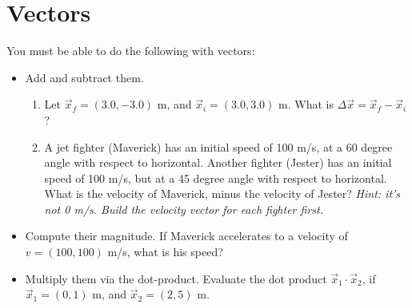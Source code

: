 \documentclass[10pt]{article}
\begin{document}
\section{Vectors}
You must be able to do the following with vectors:
\begin{itemize}
\item Add and subtract them.
\begin{enumerate}
\item Let $\vec{x}_f = (3.0,-3.0)$ m, and $\vec{x}_i = (3.0,3.0)$ m.  What is $\Delta \vec{x} = \vec{x}_f - \vec{x}_i$? \\ \vspace{1cm}
\item A jet fighter (Maverick) has an initial speed of 100 m/s, at a 60 degree angle with respect to horizontal.  Another fighter (Jester) has an initial speed of 100 m/s, but at a 45 degree angle with respect to horizontal.  What is the velocity of Maverick, minus the velocity of Jester?  \textit{Hint: it's not 0 m/s.  Build the velocity vector for each fighter first.} \\ \vspace{1.5cm}
\end{enumerate}
\item Compute their magnitude.  If Maverick accelerates to a velocity of $v = (100,100)$ m/s, what is his speed? \\ \vspace{1cm}
\item Multiply them via the dot-product.  Evaluate the dot product $\vec{x}_1 \cdot \vec{x}_2$, if $\vec{x}_1 = (0,1)$ m, and $\vec{x}_2 = (2,5)$ m. \\ \vspace{1cm} 
\end{itemize}
\end{document}
